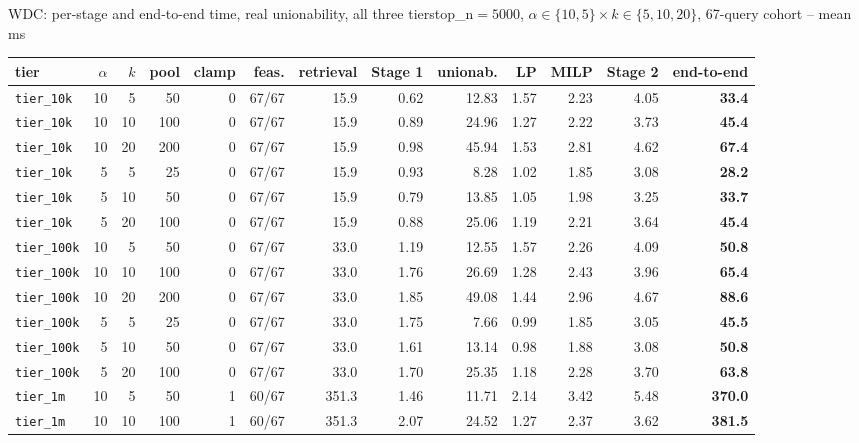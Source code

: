 \documentclass[aspectratio=169,10pt]{beamer}
\begin{document}
\begin{frame}{WDC: per-stage and end-to-end time, real unionability, all three tiers}{top\_n$=5000$, $\alpha\in\{10,5\}\times k\in\{5,10,20\}$, 67-query cohort -- mean ms}
\tiny
\begin{center}
\setlength{\tabcolsep}{3pt}
\begin{tabular}{lrrrrrrrrrrrr}
\toprule
tier & $\alpha$ & $k$ & pool & clamp & feas. & retrieval & Stage 1 & \textbf{unionab.} & LP & MILP & Stage 2 & \textbf{end-to-end} \\
\midrule
\texttt{tier\_10k} & 10 & 5 & 50 & 0 & 67/67 & 15.9 & 0.62 & 12.83 & 1.57 & 2.23 & 4.05 & \textbf{33.4} \\
\texttt{tier\_10k} & 10 & 10 & 100 & 0 & 67/67 & 15.9 & 0.89 & 24.96 & 1.27 & 2.22 & 3.73 & \textbf{45.4} \\
\texttt{tier\_10k} & 10 & 20 & 200 & 0 & 67/67 & 15.9 & 0.98 & 45.94 & 1.53 & 2.81 & 4.62 & \textbf{67.4} \\
\texttt{tier\_10k} & 5 & 5 & 25 & 0 & 67/67 & 15.9 & 0.93 & 8.28 & 1.02 & 1.85 & 3.08 & \textbf{28.2} \\
\texttt{tier\_10k} & 5 & 10 & 50 & 0 & 67/67 & 15.9 & 0.79 & 13.85 & 1.05 & 1.98 & 3.25 & \textbf{33.7} \\
\texttt{tier\_10k} & 5 & 20 & 100 & 0 & 67/67 & 15.9 & 0.88 & 25.06 & 1.19 & 2.21 & 3.64 & \textbf{45.4} \\
\texttt{tier\_100k} & 10 & 5 & 50 & 0 & 67/67 & 33.0 & 1.19 & 12.55 & 1.57 & 2.26 & 4.09 & \textbf{50.8} \\
\texttt{tier\_100k} & 10 & 10 & 100 & 0 & 67/67 & 33.0 & 1.76 & 26.69 & 1.28 & 2.43 & 3.96 & \textbf{65.4} \\
\texttt{tier\_100k} & 10 & 20 & 200 & 0 & 67/67 & 33.0 & 1.85 & 49.08 & 1.44 & 2.96 & 4.67 & \textbf{88.6} \\
\texttt{tier\_100k} & 5 & 5 & 25 & 0 & 67/67 & 33.0 & 1.75 & 7.66 & 0.99 & 1.85 & 3.05 & \textbf{45.5} \\
\texttt{tier\_100k} & 5 & 10 & 50 & 0 & 67/67 & 33.0 & 1.61 & 13.14 & 0.98 & 1.88 & 3.08 & \textbf{50.8} \\
\texttt{tier\_100k} & 5 & 20 & 100 & 0 & 67/67 & 33.0 & 1.70 & 25.35 & 1.18 & 2.28 & 3.70 & \textbf{63.8} \\
\texttt{tier\_1m} & 10 & 5 & 50 & 1 & 60/67 & 351.3 & 1.46 & 11.71 & 2.14 & 3.42 & 5.48 & \textbf{370.0} \\
\texttt{tier\_1m} & 10 & 10 & 100 & 1 & 60/67 & 351.3 & 2.07 & 24.52 & 1.27 & 2.37 & 3.62 & \textbf{381.5} \\

\end{tabular}
\end{center}
\end{frame}
\end{document}
